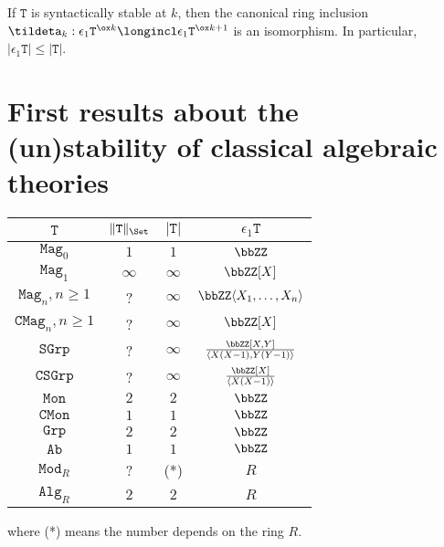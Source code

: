 \documentclass[a4paper, 12pt]{article}
\newcommand{\theory}{\mathtt}
\begin{document}
\begin{theorem} \label{th:eps1stab}
    If $\theory{T}$ is syntactically stable at $k$, then the canonical ring inclusion $\tildeta_k : \epsilon_1 \theory{T}^{\ox k} \longincl \epsilon_1 \theory{T}^{\ox k+1}$ is an isomorphism. In particular, $| \epsilon_1 \theory{T} | \leq | \theory{T} |$.
\end{theorem}

\section{First results about the (un)stability of classical algebraic theories}

\begin{center} \begin{tabular}{|c|c|c|c|}
\hline
    $\theory{T}$ & $\Vert \theory{T} \Vert_{\Set}$ & $\vert \theory{T} \vert$ & $\epsilon_1 \theory{T}$ \\
\hline \hline
    $\theory{Mag}_0$   & $1$        & $1$      & $\bbZZ$     \\
\hline
    $\theory{Mag}_1$   & $\infty$ & $\infty$ & $\bbZZ [X]$ \\
\hline
    $\theory{Mag}_n, n \geq 1$  & ?  & $\infty$ & $\bbZZ \langle X_1, \ldots, X_n \rangle$ \\
\hline
    $\theory{CMag}_n, n \geq 1$ & ?  & $\infty$ & $\bbZZ [X]$ \\
\hline
    $\theory{SGrp}$    & ?        & $\infty$ & $\frac{\bbZZ [X, Y]}{\langle X(X-1), Y(Y-1) \rangle}$ \\
\hline
    $\theory{CSGrp}$   & ?        & $\infty$ & $\frac{\bbZZ [X]}{\langle X(X-1) \rangle}$ \\
\hline
    $\theory{Mon}$     & $2$      & $2$      & $\bbZZ$     \\
\hline
    $\theory{CMon}$    & $1$      & $1$      & $\bbZZ$     \\
\hline
    $\theory{Grp}$     & $2$      & $2$      & $\bbZZ$     \\
\hline
    $\theory{Ab}$      & $1$      & $1$      & $\bbZZ$     \\
\hline
    $\theory{Mod}_R$   & ?        & (*)      & $R$         \\
\hline
    $\theory{Alg}_R$   & $2$      & $2$      & $R$         \\
\hline
\end{tabular} \end{center}
where (*) means the number depends on the ring $R$.
\end{document}
